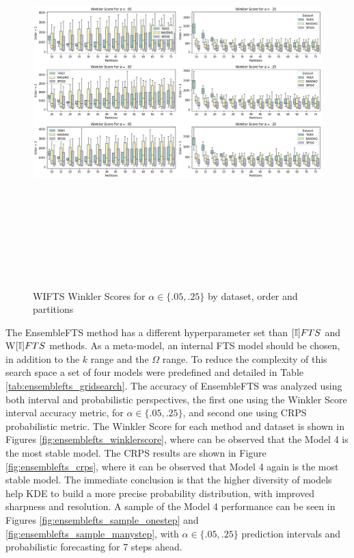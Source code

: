 \begin{figure}[htb]
    \centering
    \includegraphics[width=\textwidth,height=15cm]{figures/wifts_gridsearch.png}
    \caption{WIFTS Winkler Scores for $\alpha \in \{.05, .25\}$ by dataset, order and partitions}
    \label{fig:wifts_gridsearch}
\end{figure}



The EnsembleFTS method has a different hyperparameter set than $[\mathbb{I}]FTS$ and W$[\mathbb{I}]FTS$ methods. As a meta-model, an internal FTS model should be chosen, in addition to the $k$ range and the $\Omega$ range. To reduce the complexity of this search space a set of four models were predefined and detailed in Table \ref{tab:ensemblefts_gridsearch}. The accuracy of EnsembleFTS was analyzed using both interval and probabilistic perspectives, the first one using the Winkler Score interval accuracy metric, for  $\alpha \in \{.05, .25\}$, and second one using CRPS probabilistic metric. The Winkler Score for each method and dataset is shown in Figures \ref{fig:ensemblefts_winklerscore}, where can be observed that the Model 4 is the most stable model. The CRPS results are shown in Figure  \ref{fig:ensemblefts_crps}, where it can be observed that Model 4 again is the most stable model. The immediate conclusion is that the higher diversity of models help KDE to build a more precise probability distribution, with improved sharpness and resolution.  A sample of the Model 4 performance can be seen in Figures \ref{fig:ensemblefts_sample_onestep} and \ref{fig:ensemblefts_sample_manystep}, with $\alpha \in \{.05, .25\}$ prediction intervals and probabilistic forecasting for 7 steps ahead.  

